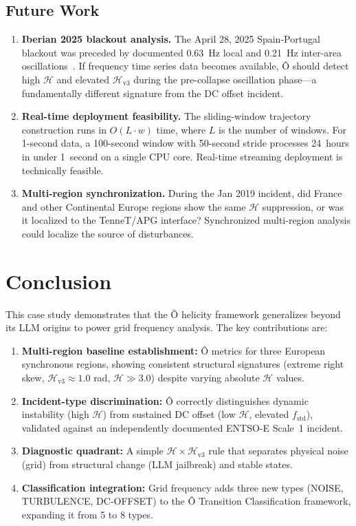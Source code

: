 \documentclass[11pt,a4paper]{article}
\begin{document}
\subsection{Future Work}

\begin{enumerate}[label=(\arabic*)]
    \item \textbf{Iberian 2025 blackout analysis.} The April 28, 2025 Spain-Portugal blackout was preceded by documented 0.63~Hz local and 0.21~Hz inter-area oscillations~\cite{iberian_blackout}. If frequency time series data becomes available, Ô should detect high $\mathcal{H}$ and elevated $\mathcal{H}_{\text{v3}}$ during the pre-collapse oscillation phase—a fundamentally different signature from the DC offset incident.
    \item \textbf{Real-time deployment feasibility.} The sliding-window trajectory construction runs in $O(L \cdot w)$ time, where $L$ is the number of windows. For 1-second data, a 100-second window with 50-second stride processes 24~hours in under 1~second on a single CPU core. Real-time streaming deployment is technically feasible.
    \item \textbf{Multi-region synchronization.} During the Jan 2019 incident, did France and other Continental Europe regions show the same $\mathcal{H}$ suppression, or was it localized to the TenneT/APG interface? Synchronized multi-region analysis could localize the source of disturbances.
\end{enumerate}

\section{Conclusion}

This case study demonstrates that the Ô helicity framework generalizes beyond its LLM origins to power grid frequency analysis. The key contributions are:

\begin{enumerate}[label=(\arabic*)]
    \item \textbf{Multi-region baseline establishment:} Ô metrics for three European synchronous regions, showing consistent structural signatures (extreme right skew, $\mathcal{H}_{\text{v3}} \approx 1.0$ rad, $\mathcal{H} \gg 3.0$) despite varying absolute $\mathcal{H}$ values.
    \item \textbf{Incident-type discrimination:} Ô correctly distinguishes dynamic instability (high $\mathcal{H}$) from sustained DC offset (low $\mathcal{H}$, elevated $f_{\text{std}}$), validated against an independently documented ENTSO-E Scale~1 incident.
    \item \textbf{Diagnostic quadrant:} A simple $\mathcal{H} \times \mathcal{H}_{\text{v3}}$ rule that separates physical noise (grid) from structural change (LLM jailbreak) and stable states.
    \item \textbf{Classification integration:} Grid frequency adds three new types (NOISE, TURBULENCE, DC-OFFSET) to the Ô Transition Classification framework, expanding it from 5 to 8 types.
\end{enumerate}
\end{document}
